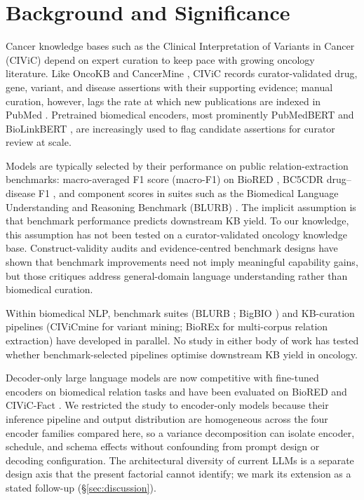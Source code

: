 \section{Background and Significance}
\label{sec:background}

Cancer knowledge bases such as the Clinical Interpretation of
Variants in Cancer (CIViC) \citep{griffith2017civic} depend on
expert curation to keep pace with growing oncology literature.
Like OncoKB \citep{chakravarty2017oncokb} and CancerMine
\citep{lever2019cancermine}, CIViC records curator-validated
drug, gene, variant, and disease assertions with their supporting
evidence; manual curation, however, lags the rate at which new
publications are indexed in PubMed \citep{civicfact2025}. Pretrained
biomedical encoders, most prominently PubMedBERT
\citep{gu2021pubmedbert} and BioLinkBERT
\citep{yasunaga2022biolinkbert}, are increasingly used to flag
candidate assertions for curator review at scale.

Models are typically selected by their performance on public
relation-extraction benchmarks: macro-averaged F1 score (macro-F1)
on BioRED \citep{luo2022biored}, BC5CDR drug--disease F1
\citep{li2016bc5cdr}, and component scores in suites such as the
Biomedical Language Understanding and Reasoning Benchmark
(BLURB) \citep{gu2021pubmedbert}. The implicit assumption is that
benchmark performance predicts downstream KB yield. To our
knowledge, this assumption has not been tested on a
curator-validated oncology knowledge base. Construct-validity
audits \citep{bowman2021construct} and evidence-centred benchmark
designs \citep{liu2024ecbd} have shown that benchmark improvements
need not imply meaningful capability gains, but those critiques
address general-domain language understanding rather than
biomedical curation.

Within biomedical NLP, benchmark suites (BLURB
\citep{gu2021pubmedbert}; BigBIO \citep{fries2022bigbio}) and
KB-curation pipelines (CIViCmine \citep{lever2019civicmine} for
variant mining; BioREx \citep{lai2023biorex} for multi-corpus
relation extraction) have developed in parallel. No study in
either body of work has tested whether benchmark-selected pipelines
optimise downstream KB yield in oncology.

Decoder-only large language models are now competitive with
fine-tuned encoders on biomedical relation tasks
\citep{chen2025nlpbench} and have been evaluated on BioRED and
CIViC-Fact \citep{civicfact2025}. We restricted the study to
encoder-only models because their inference pipeline and output
distribution are homogeneous across the four encoder families
compared here, so a variance decomposition can isolate encoder,
schedule, and schema effects without confounding from prompt
design or decoding configuration. The architectural diversity of
current LLMs is a separate design axis that the present factorial
cannot identify; we mark its extension as a stated follow-up
(\S\ref{sec:discussion}).


